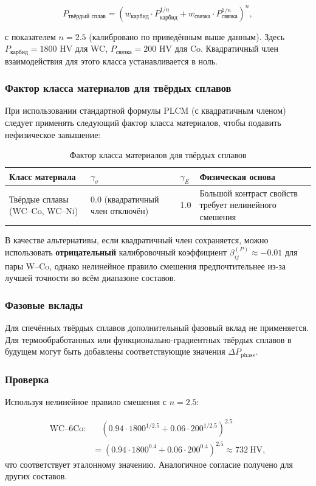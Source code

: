 \documentclass[12pt,a4paper]{article}
\begin{document}
	\[
	P_{\text{твёрдый сплав}} = \left( w_{\text{карбид}} \cdot P_{\text{карбид}}^{1/n} + w_{\text{связка}} \cdot P_{\text{связка}}^{1/n} \right)^{n},
	\]
	
	с показателем $n = 2.5$ (калибровано по приведённым выше данным). Здесь $P_{\text{карбид}} = 1800$ HV для WC, $P_{\text{связка}} = 200$ HV для Co. Квадратичный член взаимодействия для этого класса устанавливается в ноль.
	
	\subsubsection{Фактор класса материалов для твёрдых сплавов}
	При использовании стандартной формулы PLCM (с квадратичным членом) следует применять следующий фактор класса материалов, чтобы подавить нефизическое завышение:
	
	\begin{longtable}{p{3.5cm} p{2.5cm} p{2.5cm} p{5cm}}
		\caption{Фактор класса материалов для твёрдых сплавов}\\
		\toprule
		\textbf{Класс материала} & $\gamma_{\sigma}$ & $\gamma_{E}$ & \textbf{Физическая основа} \\
		\midrule
		Твёрдые сплавы (WC–Co, WC–Ni) & 0.0 (квадратичный член отключён) & 1.0 & Большой контраст свойств требует нелинейного смешения \\
		\bottomrule
	\end{longtable}
	
	В качестве альтернативы, если квадратичный член сохраняется, можно использовать \textbf{отрицательный} калибровочный коэффициент $\beta_{ij}^{(P)} \approx -0.01$ для пары W–Co, однако нелинейное правило смешения предпочтительнее из-за лучшей точности во всём диапазоне составов.
	
	\subsubsection{Фазовые вклады}
	Для спечённых твёрдых сплавов дополнительный фазовый вклад не применяется. Для термообработанных или функционально-градиентных твёрдых сплавов в будущем могут быть добавлены соответствующие значения $\Delta P_{\text{phase}}$.
	
	\subsubsection{Проверка}
	Используя нелинейное правило смешения с $n=2.5$:
	
	\[
	\begin{aligned}
		\text{WC–6Co:}&\quad (0.94\cdot1800^{1/2.5} + 0.06\cdot200^{1/2.5})^{2.5} \\
		&= (0.94\cdot1800^{0.4} + 0.06\cdot200^{0.4})^{2.5} \approx 732\ \text{HV},
	\end{aligned}
	\]
	что соответствует эталонному значению. Аналогичное согласие получено для других составов.
	
\end{document}
